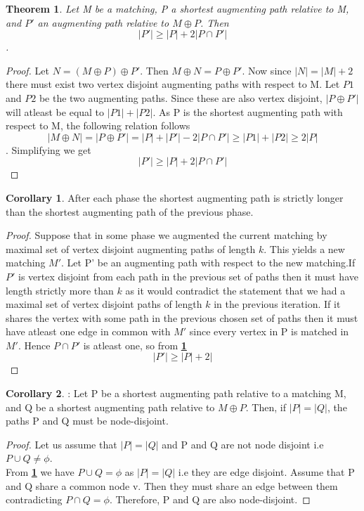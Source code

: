 \documentclass[a4paper]{report}
\newtheorem{theorem}{Theorem}[section]
\theoremstyle{definition}
\newtheorem{cor}{Corollary}[theorem]
\begin{document}
\begin{theorem}\label{minlenshpath}
Let M be a matching, P a shortest augmenting path relative to
M, and $P'$ an augmenting path relative to $M \oplus P$. Then
$$|P'| \geq |P| + 2|P \cap P'|$$.
\end{theorem} 
\begin{proof}
 Let $N=(M \oplus P)\oplus P'$. Then $M \oplus N = P \oplus P'$. Now since $|N|=|M|+2$ there must exist two vertex disjoint augmenting paths with respect to M. Let $P1$ and $P2$ be the two augmenting paths. Since these are also vertex disjoint, $|P \oplus P'|$ will atleast be equal to $|P1|+|P2|$.
As P is the shortest augmenting path with respect to M, the following relation follows $$|M \oplus N|=|P\oplus P'|=|P|+|P'|-2|P \cap P'| \geq |P1|+|P2| \geq 2|P|$$. Simplifying we get $$ |P'| \geq |P|+2|P \cap P'|$$
\end{proof} 
\begin{cor} After each phase the shortest augmenting path is strictly longer than the shortest augmenting path of the previous phase.
\end{cor}
\begin{proof}
Suppose that in some phase we augmented the current matching by maximal set of vertex disjoint augmenting paths of length $k$. This yields a new matching $M'$. Let P' be an augmenting path with respect to the new matching.If $P'$ is vertex disjoint from each path in the previous set of paths then it must have length strictly more than $k$ as it would contradict the statement that we had a maximal set of vertex disjoint paths of length $k$ in the previous iteration. If it shares the vertex with some path in the previous chosen set of paths then it must have atleast one edge in common with $M'$ since every vertex in P is matched in $M'$. Hence $P\cap P'$ is atleast one, so from \textbf{\ref{minlenshpath}} $$|P'| \geq |P|+2|$$
\end{proof} 
\begin{cor}: Let P be a shortest augmenting path relative to a matching M, and Q be a shortest augmenting path relative to $M \oplus P$. Then, if $|P| = |Q|$, the paths P and Q must be node-disjoint.
\end{cor}
\begin{proof}
Let us assume that  $|P| = |Q|$ and P and Q are not node disjoint i.e $P\cup Q \neq \phi$.\\
From \textbf{\ref{minlenshpath}} we have $P\cup Q = \phi$ as $|P| = |Q|$ i.e they are edge disjoint. Assume that P and Q share a common node v. Then they must share an edge between them contradicting $P \cap Q = \phi.$ Therefore, P and Q are also node-disjoint.
\end{proof} 
\end{document}
